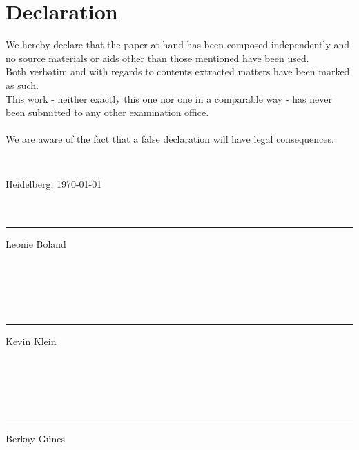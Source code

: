 \thispagestyle{empty}

\section*{Declaration}

We hereby declare that the paper at hand has been composed independently and no source materials or aids other than those mentioned have been used.\\
Both verbatim and with regards to contents extracted matters have been marked as such. \\
This work - neither exactly this one nor one in a comparable way - has never been submitted to any other examination office. \\
\\
We are aware of the fact that a false declaration will have legal consequences.
\begin{verbatim}


\end{verbatim}
Heidelberg, \today \\ \\ \\
\hfill \parbox[t]{5cm}{\centering\hrule\medskip Leonie Boland}\\ \\ \\ \\
\parbox[t]{5cm}{\centering\hrule\medskip Kevin Klein}\\ \\ \\ \\
\parbox[t]{5cm}{\centering\hrule\medskip Berkay Günes}